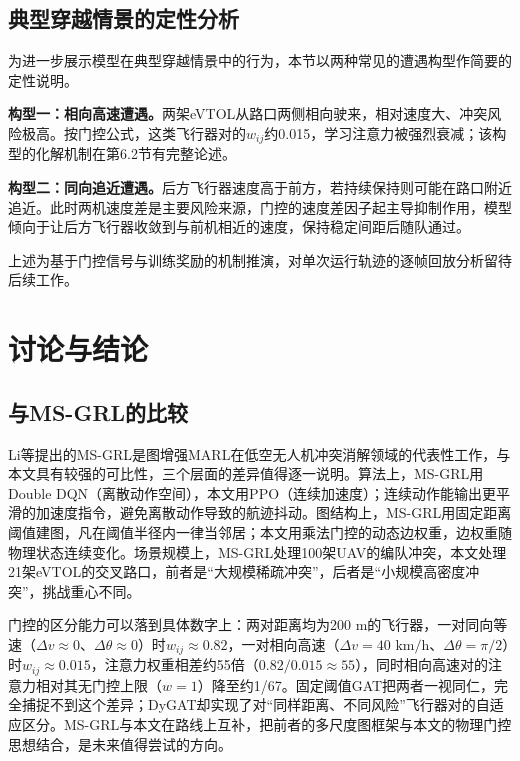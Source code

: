 \documentclass[12pt,a4paper,UTF8]{ctexart}
\begin{document}
\subsection{典型穿越情景的定性分析}

为进一步展示模型在典型穿越情景中的行为，本节以两种常见的遭遇构型作简要的定性说明。

\textbf{构型一：相向高速遭遇。}两架eVTOL从路口两侧相向驶来，相对速度大、冲突风险极高。按门控公式，这类飞行器对的$w_{ij}$约0.015，学习注意力被强烈衰减；该构型的化解机制在第6.2节有完整论述。

\textbf{构型二：同向追近遭遇。}后方飞行器速度高于前方，若持续保持则可能在路口附近追近。此时两机速度差是主要风险来源，门控的速度差因子起主导抑制作用，模型倾向于让后方飞行器收敛到与前机相近的速度，保持稳定间距后随队通过。

上述为基于门控信号与训练奖励的机制推演，对单次运行轨迹的逐帧回放分析留待后续工作。

\section{讨论与结论}

\subsection{与MS-GRL的比较}

Li等\cite{ref10}提出的MS-GRL是图增强MARL在低空无人机冲突消解领域的代表性工作，与本文具有较强的可比性，三个层面的差异值得逐一说明。算法上，MS-GRL用Double DQN（离散动作空间），本文用PPO（连续加速度）；连续动作能输出更平滑的加速度指令，避免离散动作导致的航迹抖动。图结构上，MS-GRL用固定距离阈值建图，凡在阈值半径内一律当邻居；本文用乘法门控的动态边权重，边权重随物理状态连续变化。场景规模上，MS-GRL处理100架UAV的编队冲突，本文处理21架eVTOL的交叉路口，前者是“大规模稀疏冲突”，后者是“小规模高密度冲突”，挑战重心不同。

门控的区分能力可以落到具体数字上：两对距离均为200 m的飞行器，一对同向等速（$\Delta v\approx0$、$\Delta\theta\approx0$）时$w_{ij}\approx0.82$，一对相向高速（$\Delta v=40$ $\mathrm{km/h}$、$\Delta\theta=\pi/2$）时$w_{ij}\approx0.015$，注意力权重相差约55倍（$0.82/0.015\approx55$），同时相向高速对的注意力相对其无门控上限（$w=1$）降至约1/67。固定阈值GAT把两者一视同仁，完全捕捉不到这个差异；DyGAT却实现了对“同样距离、不同风险”飞行器对的自适应区分。MS-GRL与本文在路线上互补，把前者的多尺度图框架与本文的物理门控思想结合，是未来值得尝试的方向。
\end{document}

